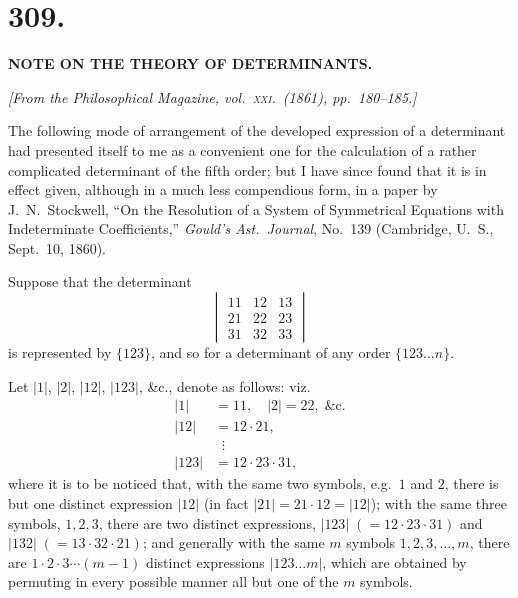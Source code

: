 \documentclass[11pt,a4paper]{article}
\begin{document}
\bigskip

\section*{309.}

\begin{center}
\textbf{NOTE ON THE THEORY OF DETERMINANTS.}
\end{center}

\bigskip

\noindent\textit{[From the Philosophical Magazine, vol.\ \textsc{xxi}.\ (1861), pp.\ 180--185.]}

\bigskip

The following mode of arrangement of the developed expression of a determinant had presented itself to me as a convenient one for the calculation of a rather complicated determinant of the fifth order; but I have since found that it is in effect given, although in a much less compendious form, in a paper by J.\ N.\ Stockwell, ``On the Resolution of a System of Symmetrical Equations with Indeterminate Coefficients,'' \textit{Gould's Ast.\ Journal}, No.\ 139 (Cambridge, U.~S., Sept.\ 10, 1860).

Suppose that the determinant
\[
\begin{vmatrix} 11 & 12 & 13 \\ 21 & 22 & 23 \\ 31 & 32 & 33 \end{vmatrix}
\]
is represented by $\{123\}$, and so for a determinant of any order $\{123\ldots n\}$.

Let $|1|$, $|2|$, $|12|$, $|123|$, \&c., denote as follows: viz.
\begin{align*}
|1| &= 11,\quad |2|=22,\;\&\mathrm{c}.\\
|12| &= 12\cdot 21,\\
&\;\;\vdots\\
|123| &= 12\cdot 23\cdot 31,
\end{align*}
where it is to be noticed that, with the same two symbols, e.g.\ $1$ and $2$, there is but one distinct expression $|12|$ (in fact $|21|=21\cdot 12=|12|$); with the same three symbols, $1,2,3$, there are two distinct expressions, $|123|\;(=12\cdot 23\cdot 31)$ and $|132|\;(=13\cdot 32\cdot 21)$; and generally with the same $m$ symbols $1,2,3,\ldots,m$, there are $1\cdot 2\cdot 3\cdots(m-1)$ distinct expressions $|123\ldots m|$, which are obtained by permuting in every possible manner all but one of the $m$ symbols.
\end{document}
